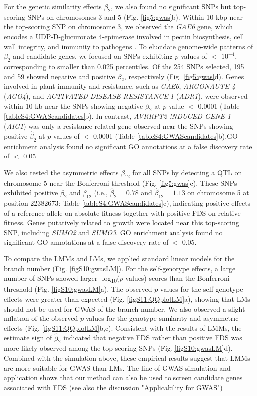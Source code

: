 \documentclass[12pt,]{article}
\begin{document}
For the genetic similarity effects $\beta_2$, we also found no significant SNPs but top-scoring SNPs on chromosomes 3 and 5 (Fig. \ref{fig5:gwas}b). Within 10 kbp near the top-scoring SNP on chromosome 3, we observed the \textit{GAE6} gene, which encodes a UDP-D-glucuronate 4-epimerase involved in pectin biosynthesis, cell wall integrity, and immunity to pathogens \citep{bethke2016pectin}. To elucidate genome-wide patterns of $\beta_2$ and candidate genes, we focused on SNPs exhibiting $p$-values of $<$ $10^{-4}$, corresponding to smaller than 0.025 percentiles. Of the 254 SNPs selected, 195 and 59 showed negative and positive $\beta_2$, respectively (Fig. \ref{fig5:gwas}d). Genes involved in plant immunity and resistance, such as \textit{GAE6}, \textit{ARGONAUTE 4} (\textit{AGO4}), and \textit{ACTIVATED DISEASE RESISTANCE 1} (\textit{ADR1}), were observed within 10 kb near the SNPs showing negative $\beta_2$ at $p$-value $<$ 0.0001 (Table \ref{tableS4:GWAScandidates}b). In contrast, \textit{AVRRPT2-INDUCED GENE 1} (\textit{AIG1}) was only a resistance-related gene observed near the SNPs showing positive $\hat{\beta}_2$ at $p$-values of $<$ 0.0001 (Table \ref{tableS4:GWAScandidates}b).GO enrichment analysis found no significant GO annotations at a false discovery rate of $<$ 0.05.

We also tested the asymmetric effects $\beta_{12}$ for all SNPs by detecting a QTL on chromosome 5 near the Bonferroni threshold (Fig. \ref{fig5:gwas}c). These SNPs exhibited positive $\beta_2$ and $\beta_{12}$ (i.e., $\hat{\beta}_2=0.78$ and $\hat{\beta}_{12}=1.13$ on chromosome 5 at position 22382673: Table \ref{tableS4:GWAScandidates}c), indicating positive effects of a reference allele on absolute fitness together with positive FDS on relative fitness. Genes putatively related to growth were located near this top-scoring SNP, including \textit{SUMO2} and \textit{SUMO3}. GO enrichment analysis found no significant GO annotations at a false discovery rate of $<$ 0.05.

To compare the LMMs and LMs, we applied standard linear models for the branch number (Fig. \ref{figS10:gwasLM}). For the self-genotype effects, a large number of SNPs showed larger -log\textsubscript{10}($p$-values) scores than the Bonferroni threshold (Fig. \ref{figS10:gwasLM}a). The observed $p$-values for the self-genotype effects were greater than expected (Fig. \ref{figS11:QQplotLM}a), showing that LMs should not be used for GWAS of the branch number. We also observed a slight inflation of the observed $p$-values for the genotype similarity and asymmetric effects (Fig. \ref{figS11:QQplotLM}b,c). Consistent with the results of LMMs, the estimate sign of $\hat{\beta}_2$ indicated that negative FDS rather than positive FDS was more likely observed among the top-scoring SNPs (Fig. \ref{figS10:gwasLM}d). Combined with the simulation above, these empirical results suggest that LMMs are more suitable for GWAS than LMs. The line of GWAS simulation and application shows that our method can also be used to screen candidate genes associated with FDS (see also the discussion "Applicability for GWAS")
\end{document}

